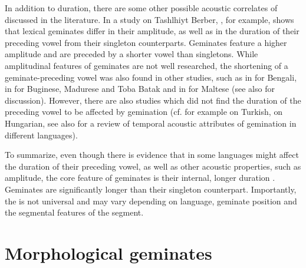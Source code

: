 In addition to duration, there are some other possible acoustic correlates of  discussed in the literature. In a study on Tashlhiyt Berber, \cite{Ridouane.2010}, for example, shows  that {lexical geminates} differ in their  amplitude, as well as in the duration of their preceding vowel from their singleton counterparts. Geminates feature a higher amplitude and are preceded by a shorter vowel than singletons. While amplitudinal features of {geminates} are not well researched,  the shortening of a geminate-preceding vowel was also found in other studies, such as in \cite{Lahiri.1988} for Bengali, in \cite{Cohn.1999} for Buginese, Madurese and Toba Batak and in  \cite{Galea.2016} for Maltese (see also \citealt{Maddieson.1985} for discussion). However, there are also studies which did not find the duration of the preceding vowel to be affected by {gemination} (cf. for example \citealt{Lahiri.1988} on Turkish, \citealt{Ham.2001} on Hungarian, see also \citealt[6]{Ridouane.2010} for a review of temporal acoustic attributes of {gemination} in different languages).

To summarize, even though there is evidence that in some languages  might affect the duration of their preceding vowel, as well as other acoustic properties, such as amplitude, the core feature of {geminates} is their internal, longer duration . Geminates are significantly longer than their singleton counterpart. Importantly, the  is not universal and may vary depending on language, {geminate} position and the segmental features of the segment.



\section{Morphological geminates}\label{Morphological Gemination}

